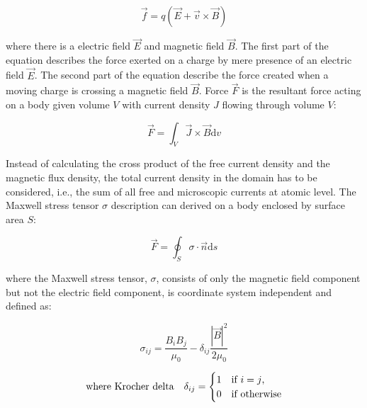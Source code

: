         
        \begin{equation}
            \overrightarrow{f} = q(\overrightarrow{E} + \overrightarrow{v} \times \overrightarrow{B})
            \label{eq:lorentz force equation}
        \end{equation}   
        
        
        where there is a electric field $\overrightarrow{E}$ and magnetic field $\overrightarrow{B}$. The first part of the equation describes the force exerted on a charge by mere presence of an electric field $\overrightarrow{E}$. The second part of the equation describe the force created when a moving charge is crossing a magnetic field $\overrightarrow{B}$. Force $\overrightarrow{F}$ is the resultant force acting on a body given volume $V$ with current density $J$ flowing through volume $V$:
        
      
        \begin{equation}
            \overrightarrow{F} = \int_V \overrightarrow{J} \times \overrightarrow{B} \mathrm{d}v
            \label{eq:volume generalized lorentz}
        \end{equation} 
        
        
        Instead of calculating the cross product of the free current density and the magnetic flux density, the total current density in the domain has to be considered, i.e., the sum of all free and microscopic currents at atomic level. The Maxwell stress tensor $\sigma$ description can derived on a body enclosed by surface area $S$:
        
        
        \begin{equation}
            \overrightarrow{F} = \oint_{S} \sigma \cdot \overrightarrow{n} \mathrm{d}s
            \label{eq:surface generalized lorentz}
        \end{equation}     


        where the Maxwell stress tensor, $\sigma$, consists of only the magnetic field component but not the electric field component, is coordinate system independent and defined as:


        \begin{equation}
            \label{eq:maxwell stress tensor}
            \sigma_{ij} = \frac{B_i B_j}{\mu_0} - \delta_{ij} \frac{| \overrightarrow{B} |^{2}}{2\mu_0}
        \end{equation}
                
        \begin{equation}
            \notag
            \begin{split}
                \text{where Krocher delta} \quad \delta_{ij} =
                    \begin{cases}
                        1       & \text{if $i=j$,}\\
                        0       & \text{if otherwise}
                    \end{cases}
            \end{split}
        \end{equation}
        


